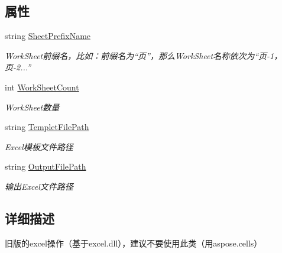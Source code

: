 \subsection*{属性}
\begin{DoxyCompactItemize}
\item 
string \hyperlink{class_x_c_l_net_tools_1_1_office_1_1_excel_handler_1_1_excel_helper_afa37d1f7b1b3cbb06dcacffc908fbcb6}{Sheet\-Prefix\-Name}
\begin{DoxyCompactList}\small\item\em Work\-Sheet前缀名，比如：前缀名为“页”，那么\-Work\-Sheet名称依次为“页-\/1，页-\/2...” \end{DoxyCompactList}\item 
int \hyperlink{class_x_c_l_net_tools_1_1_office_1_1_excel_handler_1_1_excel_helper_a2354740ddfdb8dbef974f91258c672e0}{Work\-Sheet\-Count}
\begin{DoxyCompactList}\small\item\em Work\-Sheet数量 \end{DoxyCompactList}\item 
string \hyperlink{class_x_c_l_net_tools_1_1_office_1_1_excel_handler_1_1_excel_helper_a5ea43ea5bce7424c7ad90335ddeb09bd}{Templet\-File\-Path}
\begin{DoxyCompactList}\small\item\em Excel模板文件路径 \end{DoxyCompactList}\item 
string \hyperlink{class_x_c_l_net_tools_1_1_office_1_1_excel_handler_1_1_excel_helper_a208fdf6acc1a32a42377d798020aeee3}{Output\-File\-Path}
\begin{DoxyCompactList}\small\item\em 输出\-Excel文件路径 \end{DoxyCompactList}\end{DoxyCompactItemize}


\subsection{详细描述}
旧版的excel操作（基于excel.\-dll），建议不要使用此类（用aspose.\-cells） 



